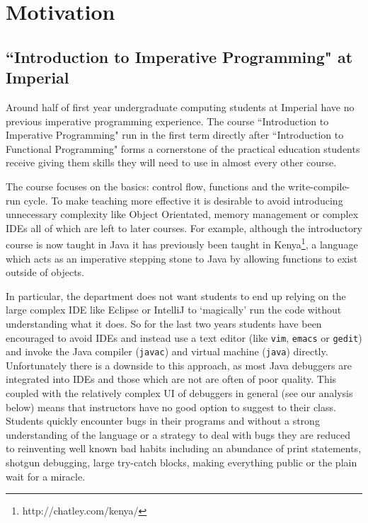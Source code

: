 \documentclass[11pt, a4paper]{article}
\newcommand{\cmd}[1]{{\tt #1}}
\begin{document}
\clearpage
\tableofcontents
\clearpage

\section{Motivation}
\subsection{``Introduction to Imperative Programming" at Imperial}
Around half of first year undergraduate computing students at Imperial have no previous imperative programming experience\cite{projectproposal}. 
The course ``Introduction to Imperative Programming" run in the first term directly after ``Introduction to Functional Programming" forms a cornerstone of the practical education students receive giving them skills they will need to use in almost every other course.

The course focuses on the basics: control flow, functions and the write-compile-run cycle.
To make teaching more effective it is desirable to avoid introducing unnecessary complexity like Object Orientated, memory management or complex IDEs all of which are left to later courses.
For example, although the introductory course is now taught in Java it has previously been taught in Kenya\footnote{http://chatley.com/kenya/}, a language which acts as an imperative stepping stone to Java by allowing functions to exist outside of objects.

In particular, the department does not want students to end up relying on the large complex IDE like Eclipse or IntelliJ to `magically' run the code without understanding what it does.
So for the last two years students have been encouraged to avoid IDEs and instead use a text editor (like \cmd{vim}, \cmd{emacs} or \cmd{gedit}) and invoke the Java compiler (\cmd{javac}) and virtual machine (\cmd{java}) directly.
Unfortunately there is a downside to this approach, as most Java debuggers are integrated into IDEs and those which are not are often of poor quality. This coupled with the relatively complex UI of debuggers in general (see our analysis below) means that instructors have no good option to suggest to their class.
Students quickly encounter bugs in their programs and without a strong understanding of the language or a strategy to deal with bugs they are reduced to reinventing well known bad habits including an abundance of print statements, shotgun debugging, large try-catch blocks, making everything public or the plain wait for a miracle.
\end{document}
